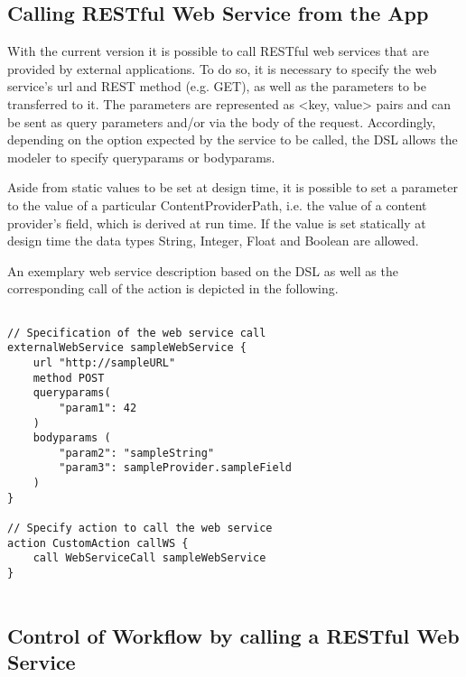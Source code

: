 \subsection{Calling RESTful Web Service from the App}
\label{subsec: CallingWebServices}
With the current \MD version it is possible to call RESTful web services that are provided by external applications. To do so, it is necessary to specify the web service's url and REST method (e.g. GET), as well as the parameters to be transferred to it. The parameters are represented as <key, value> pairs and can be sent as query parameters and/or via the body of the request. Accordingly, depending on the option expected by the service to be called, the DSL allows the modeler to specify queryparams or bodyparams. 

Aside from static values to be set at design time, it is possible to set a parameter to the value of a particular ContentProviderPath, i.e. the value of a content provider's field, which is derived at run time. If the value is set statically at design time the data types String, Integer, Float and Boolean are allowed. 

An exemplary web service description based on the DSL as well as the corresponding call of the action is depicted in the following.

\begin{lstlisting}[language=MD2, label=lst:callWSfromWF, caption=Calling a Web Service From Within a Workflow]

// Specification of the web service call
externalWebService sampleWebService {
	url "http://sampleURL"
	method POST
	queryparams(
		"param1": 42	
	)
	bodyparams (
		"param2": "sampleString"
		"param3": sampleProvider.sampleField
	)
}

// Specify action to call the web service
action CustomAction callWS {
	call WebServiceCall sampleWebService
}
	
\end{lstlisting}





\subsection{Control of Workflow by calling a RESTful Web Service}
\label{subsec: WorkflowControlThroughWS}